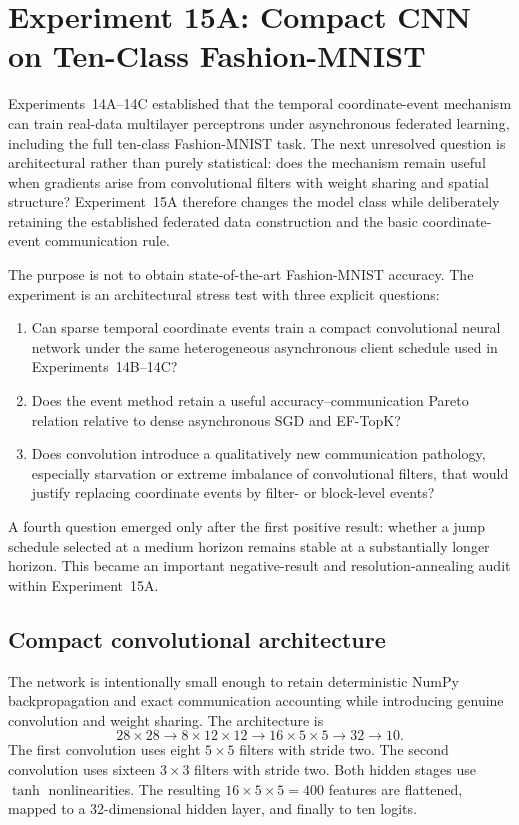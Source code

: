 \section{Experiment 15A: Compact CNN on Ten-Class Fashion-MNIST}
\label{sec:exp15a}

Experiments~14A--14C established that the temporal coordinate-event mechanism can train real-data multilayer perceptrons under asynchronous federated learning, including the full ten-class Fashion-MNIST task. The next unresolved question is architectural rather than purely statistical: does the mechanism remain useful when gradients arise from convolutional filters with weight sharing and spatial structure? Experiment~15A therefore changes the model class while deliberately retaining the established federated data construction and the basic coordinate-event communication rule.

The purpose is not to obtain state-of-the-art Fashion-MNIST accuracy. The experiment is an architectural stress test with three explicit questions:
\begin{enumerate}
    \item Can sparse temporal coordinate events train a compact convolutional neural network under the same heterogeneous asynchronous client schedule used in Experiments~14B--14C?
    \item Does the event method retain a useful accuracy--communication Pareto relation relative to dense asynchronous SGD and EF-TopK?
    \item Does convolution introduce a qualitatively new communication pathology, especially starvation or extreme imbalance of convolutional filters, that would justify replacing coordinate events by filter- or block-level events?
\end{enumerate}

A fourth question emerged only after the first positive result: whether a jump schedule selected at a medium horizon remains stable at a substantially longer horizon. This became an important negative-result and resolution-annealing audit within Experiment~15A.

\subsection{Compact convolutional architecture}

The network is intentionally small enough to retain deterministic NumPy backpropagation and exact communication accounting while introducing genuine convolution and weight sharing. The architecture is
\begin{equation}
28\times 28
\rightarrow
8\times 12\times 12
\rightarrow
16\times 5\times 5
\rightarrow
32
\rightarrow
10.
\end{equation}
The first convolution uses eight $5\times5$ filters with stride two. The second convolution uses sixteen $3\times3$ filters with stride two. Both hidden stages use $\tanh$ nonlinearities. The resulting $16\times5\times5=400$ features are flattened, mapped to a 32-dimensional hidden layer, and finally to ten logits.

